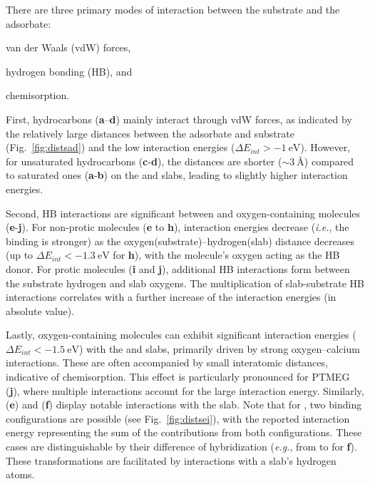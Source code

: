 \documentclass[%
aip,
amsmath,amssymb,
preprint,%
jcp,
showkeys,
]{revtex4-2}
\begin{document}
\clearpage

There are three primary modes of interaction between the substrate and the adsorbate: \begin{inparaenum}[i)] \item van der Waals (vdW) forces, 
\item hydrogen bonding (HB), and 
\item chemisorption. 
\end{inparaenum}
First, hydrocarbons (\textbf{a}–\textbf{d}) mainly interact through vdW forces, as indicated by the relatively large distances between the adsorbate and substrate (Fig.~\ref{fig:distsad}) and the low interaction energies ($\Delta E_{int} > \SI{-1}{\electronvolt}$). However, for unsaturated hydrocarbons (\textbf{c}-\textbf{d}), the distances are shorter ($\sim\SI{3}{\angstrom}$) compared to saturated ones (\textbf{a}-\textbf{b}) on the  and  slabs, leading to slightly higher interaction energies.

Second, HB interactions are significant between  and oxygen-containing mole\-cules (\textbf{e}-\textbf{j}). For non-protic molecules (\textbf{e} to \textbf{h}), interaction energies decrease (\textit{i.e.}, the binding is stronger) as the oxygen(substrate)--hydrogen(slab) distance decreases (up to $\Delta E_{int}<\SI{-1.3}{\electronvolt}$ for \textbf{h}), with the molecule's oxygen acting as the HB donor. For protic molecules (\textbf{i} and \textbf{j}), additional HB interactions form between the substrate hydrogen and slab oxygens. The multiplication of slab-substrate HB interactions correlates with a further increase of the interaction energies (in absolute value).


Lastly, oxygen-containing molecules can exhibit significant interaction energies ($\Delta E_{int} < \SI{-1.5}{\electronvolt}$) with the  and  slabs, primarily driven by strong oxygen--calcium interactions. These are often accompanied by small interatomic distances, indicative of chemisorption. This effect is particularly pronounced for PTMEG (\textbf{j}), where multiple interactions account for the large interaction energy. Similarly,  (\textbf{e}) and  (\textbf{f}) display notable interactions with the  slab. Note that for , two binding configurations are possible (see Fig.~\ref{fig:distsei}), with the reported interaction energy representing the sum of the contributions from both configurations. These cases are distinguishable by their difference of hybridization (\textit{e.g.}, from  to  for \textbf{f}). These transformations are facilitated by interactions with a slab’s hydrogen atoms.
\end{document}
